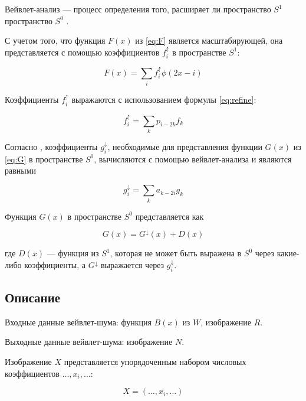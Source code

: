 Вейвлет-анализ --- процесс определения того, расширяет ли пространство $S^1$ пространство $S^0$ \cite{pixar}.

С учетом того, что функция $F(x)$ из \ref{eq:F} является масштабирующей, она представляется с помощью коэффициентов $f_i^{\uparrow}$ в пространстве $S^1$:

\begin{equation}\label{eq:Fup}
	F(x)=\sum_{i}f_i^{\uparrow}\phi(2x-i)
\end{equation}

Коэффициенты $f_i^{\uparrow}$ выражаются с использованием формулы \ref{eq:refine}:

\begin{equation}\label{eq:f_iup}
	f_i^{\uparrow}=\sum_{k}p_{i-2k}f_k
\end{equation}

Согласно \cite{pixar}, коэффициенты $g_i^{\downarrow}$, необходимые для представления функции $G(x)$ из \ref{eq:G} в пространстве $S^0$, вычисляются с помощью вейвлет-анализа и являются равными

\begin{equation}\label{eq:g_idown}
	g_i^{\downarrow}=\sum_{k}a_{k-2i}g_k
\end{equation}

Функция $G(x)$ в пространстве $S^0$ представляется как

\begin{equation}\label{eq:G_divide}
	G(x)=G^{\downarrow}(x) + D(x)
\end{equation}

где $D(x)$ --- функция из $S^1$, которая не может быть выражена в $S^0$ через какие-либо коэффициенты, а $G^{\downarrow}$ выражается через $g_i^{\downarrow}$.

\subsection{Описание}

Входные данные вейвлет-шума: функция $B(x)$ из $W$, изображение $R$.

Выходные данные вейвлет-шума: изображение $N$.

Изображение $X$ представляется упорядоченным набором числовых коэффициентов $\dots,x_i,\dots$:

\begin{equation}\label{eq:x_image}
	X=(\dots,x_i,\dots)
\end{equation}

